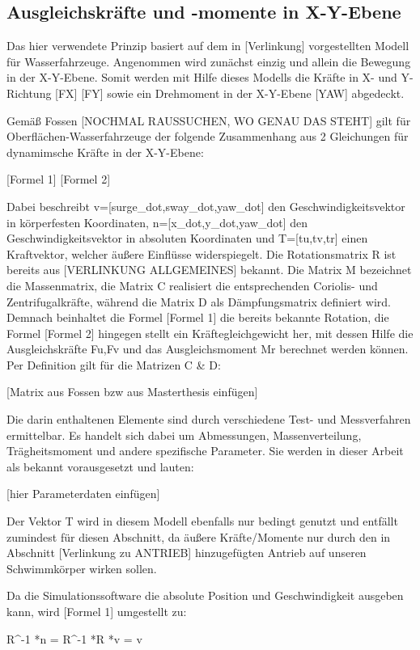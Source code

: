 %
\subsection{Ausgleichskräfte und -momente in X-Y-Ebene}
Das hier verwendete Prinzip basiert auf dem in [Verlinkung] vorgestellten Modell für Wasserfahrzeuge. Angenommen wird zunächst einzig und allein die Bewegung in der X-Y-Ebene. Somit werden mit Hilfe dieses Modells die Kräfte in X- und Y-Richtung [FX] [FY] sowie ein Drehmoment in der X-Y-Ebene [YAW] abgedeckt.

Gemäß Fossen [NOCHMAL RAUSSUCHEN, WO GENAU DAS STEHT] gilt für Oberflächen-Wasserfahrzeuge der folgende Zusammenhang aus 2 Gleichungen für dynamimsche Kräfte in der X-Y-Ebene:

[Formel 1]
[Formel 2]

Dabei beschreibt v=[surge_dot,sway_dot,yaw_dot] den Geschwindigkeitsvektor in körperfesten Koordinaten, n=[x_dot,y_dot,yaw_dot] den Geschwindigkeitsvektor in absoluten Koordinaten und T=[tu,tv,tr] einen Kraftvektor, welcher äußere Einflüsse widerspiegelt.
Die Rotationsmatrix R ist bereits aus [VERLINKUNG ALLGEMEINES] bekannt. Die Matrix M bezeichnet die Massenmatrix, die Matrix C realisiert die entsprechenden Coriolis- und Zentrifugalkräfte, während die Matrix D als Dämpfungsmatrix definiert wird. 
Demnach beinhaltet die Formel [Formel 1] die bereits bekannte Rotation, die Formel [Formel 2] hingegen stellt ein Kräftegleichgewicht her, mit dessen Hilfe die Ausgleichskräfte Fu,Fv und das Ausgleichsmoment Mr berechnet werden können. 
Per Definition gilt für die Matrizen C & D:

[Matrix aus Fossen bzw aus Masterthesis einfügen]

Die darin enthaltenen Elemente sind durch verschiedene Test- und Messverfahren ermittelbar. Es handelt sich dabei um Abmessungen, Massenverteilung, Trägheitsmoment und andere spezifische Parameter. Sie werden in dieser Arbeit als bekannt vorausgesetzt und lauten:

[hier Parameterdaten einfügen]

Der Vektor T wird in diesem Modell ebenfalls nur bedingt genutzt und entfällt zumindest für diesen Abschnitt, da äußere Kräfte/Momente nur durch den in Abschnitt [Verlinkung zu ANTRIEB] hinzugefügten Antrieb auf unseren Schwimmkörper wirken sollen. 

Da die Simulationssoftware die absolute Position und Geschwindigkeit ausgeben kann, wird [Formel 1] umgestellt zu:

R^-1 *n = R^-1 *R *v = v

